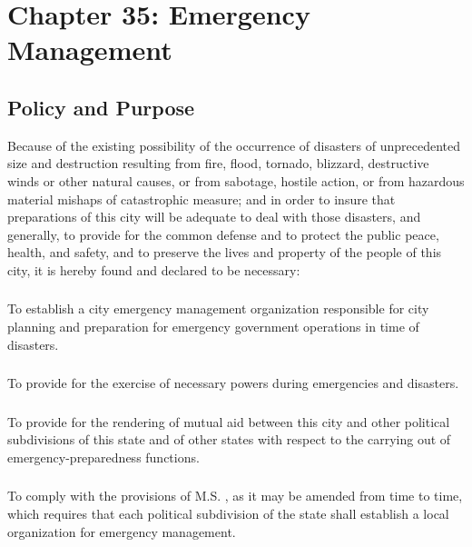 %
\chapter*{Chapter 35: \newline
	Emergency Management}

\section{Policy and Purpose}
Because of the existing possibility of the occurrence of disasters of unprecedented size and destruction resulting from fire, flood, tornado, blizzard, destructive winds or other natural causes, or from sabotage, hostile action, or from hazardous material mishaps of catastrophic measure; and in order to insure that preparations of this city will be adequate to deal with those disasters, and generally, to provide for the common defense and to protect the public peace, health, and safety, and to preserve the lives and property of the people of this city, it is hereby found and declared to be necessary:
\subsection{}
To establish a city emergency management organization responsible for city planning and preparation for emergency government operations in time of disasters.
\subsection{}
To provide for the exercise of necessary powers during emergencies and disasters.
\subsection{}
To provide for the rendering of mutual aid between this city and other political subdivisions of this state and of other states with respect to the carrying out of emergency-preparedness functions.
\subsection{}
To comply with the provisions of M.S. , as it may be amended from time to time, which requires that each political subdivision of the state shall establish a local organization for emergency management.

